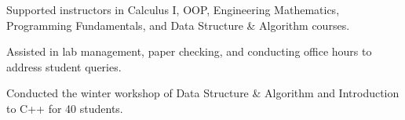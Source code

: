 \documentclass[]{resume}
\begin{document}
\begin{minipage}[t]{0.5\textwidth}

    \begin{tightemize}
        \sectionsep
        \item Supported instructors in Calculus I, OOP, Engineering Mathematics, Programming Fundamentals, and Data Structure \& Algorithm courses.
        \item Assisted in lab management, paper checking, and conducting office hours to address student queries.
    \end{tightemize}


    \begin{tightemize}
        \sectionsep
        \item Conducted the winter workshop of Data Structure \& Algorithm and Introduction to C++ for 40 students.
    \end{tightemize}





\end{minipage}
\end{document}

